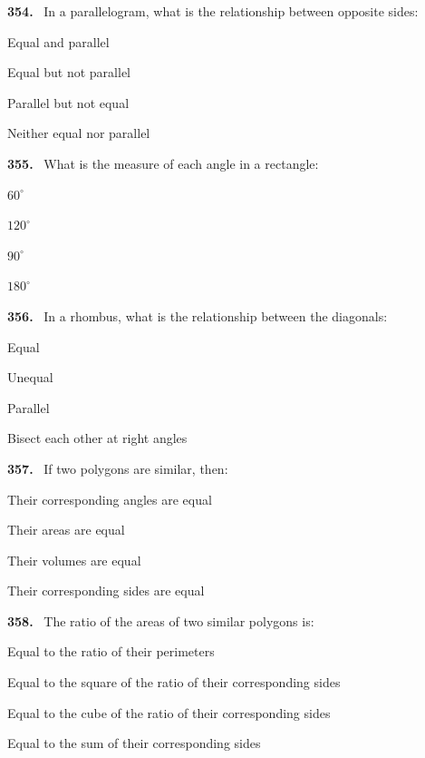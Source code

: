 \documentclass[11pt]{article}
\newenvironment{qenv}[1]{%
  \par\medskip\noindent\textbf{#1.}\ \ignorespaces
}{\par}
\begin{document}
\begin{qenv}{354} In a parallelogram, what is the relationship between opposite sides:
\begin{options} \item Equal and parallel \item Equal but not parallel \item Parallel but not equal \item Neither equal nor parallel \end{options} \end{qenv}

\begin{qenv}{355} What is the measure of each angle in a rectangle:
\begin{options} \item $60^{\circ}$ \item $120^{\circ}$ \item $90^{\circ}$ \item $180^{\circ}$ \end{options} \end{qenv}

\begin{qenv}{356} In a rhombus, what is the relationship between the diagonals:
\begin{options} \item Equal \item Unequal \item Parallel \item Bisect each other at right angles \end{options} \end{qenv}

\begin{qenv}{357} If two polygons are similar, then:
\begin{options} \item Their corresponding angles are equal \item Their areas are equal \item Their volumes are equal \item Their corresponding sides are equal \end{options} \end{qenv}

\begin{qenv}{358} The ratio of the areas of two similar polygons is:
\begin{options} \item Equal to the ratio of their perimeters \item Equal to the square of the ratio of their corresponding sides \item Equal to the cube of the ratio of their corresponding sides \item Equal to the sum of their corresponding sides \end{options} \end{qenv}
\end{document}
